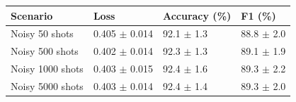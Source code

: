 \begin{tabular}{llll}
\toprule
Scenario & Loss & Accuracy (\%) & F1 (\%) \\
\midrule
Noisy 50 shots & 0.405 $\pm$ 0.014 & 92.1 $\pm$ 1.3 & 88.8 $\pm$ 2.0 \\
Noisy 500 shots & 0.402 $\pm$ 0.014 & 92.3 $\pm$ 1.3 & 89.1 $\pm$ 1.9 \\
Noisy 1000 shots & 0.403 $\pm$ 0.015 & 92.4 $\pm$ 1.6 & 89.3 $\pm$ 2.2 \\
Noisy 5000 shots & 0.403 $\pm$ 0.014 & 92.4 $\pm$ 1.4 & 89.3 $\pm$ 2.0 \\
\bottomrule
\end{tabular}
